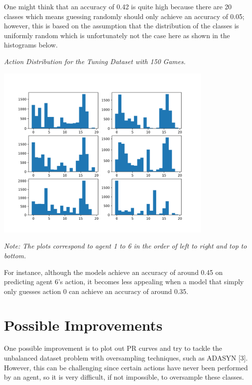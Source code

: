 \documentclass[10pt]{article}
\begin{document}
  \quad One might think that an accuracy of 0.42 is quite high because there are 20 classes which means guessing randomly should only achieve an accuracy of 0.05; however, this is based on the assumption that the distribution of the classes is uniformly random which is unfortunately not the case here as shown in the histograms below.


  \newpage
  \begin{center}
    \textit{Action Distribution for the Tuning Dataset with 150 Games.}

    \includegraphics[width=0.8\textwidth]{agent1-6_action_dist.png}

    \scriptsize

    \textit{Note: The plots correspond to agent 1 to 6 in the order of left to right and top to bottom.}

    \normalsize
  \end{center}

  \quad For instance, although the models achieve an accuracy of around 0.45 on predicting agent 6's action, it becomes less appealing when a model that simply only guesses action 0 can achieve an accuracy of around 0.35.

\section{Possible Improvements}

  \quad One possible improvement is to plot out PR curves and try to tackle the unbalanced dataset problem with oversampling techniques, such as ADASYN [3]. However, this can be challenging since certain actions have never been performed by an agent, so it is very difficult, if not impossible, to oversample these classes.
\end{document}
